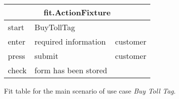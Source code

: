 \begin{figure}[H]
\centering
\begin{tabular}{|l|l|l|}
\hline 
\multicolumn{3}{|c|}{fit.ActionFixture}\tabularnewline
\hline 
start & \multicolumn{1}{l}{BuyTollTag} & \tabularnewline
\hline 
enter & required information & customer\tabularnewline
\hline 
press & submit & customer \tabularnewline
\hline 
check & \multicolumn{1}{l}{form has been stored} & \tabularnewline
\hline 
\end{tabular}
\caption{Fit table for the main scenario of use case \emph{Buy Toll Tag}.}
\end{figure}

